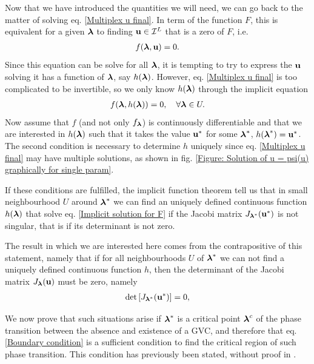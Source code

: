 \documentclass[
11pt, %
english, %
singlespacing, %
nolistspacing, %
liststotoc, %
headsepline, %
]{MastersDoctoralThesis} %
\begin{document}
Now that we have introduced the quantities we will need, we can go back to the matter of solving eq. \eqref{Multiplex u final}. In term of the function $F$, this is equivalent for a given $\boldsymbol{\mathrm{\lambda}}$ to finding $\boldsymbol{\mathrm{u}} \in \mathcal{I}^L$ that is a zero of $F$, i.e.
\begin{align}
	f(\boldsymbol{\mathrm{\lambda}}, \boldsymbol{\mathrm{u}}) = 0. \label{Implicit equation}
\end{align}
Since this equation can be solve for all $\boldsymbol{\mathrm{\lambda}}$, it is tempting to try to express the $\boldsymbol{\mathrm{u}}$ solving it has a function of $\boldsymbol{\mathrm{\lambda}}$, say $h(\boldsymbol{\mathrm{\lambda}})$. However, eq. \eqref{Multiplex u final} is too complicated to be invertible, so we only know $h(\boldsymbol{\mathrm{\lambda}})$ through the implicit equation
\begin{align}
	f(\boldsymbol{\mathrm{\lambda}}, h(\boldsymbol{\mathrm{\lambda}})) = 0, \quad \forall \boldsymbol{\mathrm{\lambda}} \in U. \label{Implicit solution for F}
\end{align}
Now assume that $f$ (and not only $f_{\boldsymbol{\mathrm{\lambda}}}$) is continuously differentiable and that we are interested in $h(\boldsymbol{\mathrm{\lambda}})$ such that it takes the value $\boldsymbol{\mathrm{u}}^*$ for some $\boldsymbol{\mathrm{\lambda}}^*$, $h(\boldsymbol{\mathrm{\lambda}}^*) = \boldsymbol{\mathrm{u}}^*$. The second condition is necessary to determine $h$ uniquely since eq. \eqref{Multiplex u final} may have multiple solutions, as shown in fig. \ref{Figure: Solution of u = psi(u) graphically for single param}.

If these conditions are fulfilled, the implicit function theorem tell us that in small neighbourhood $U$ around $\boldsymbol{\mathrm{\lambda}}^*$ we can find an uniquely defined continuous function $h(\boldsymbol{\mathrm{\lambda}})$ that solve eq. \eqref{Implicit solution for F} if the Jacobi matrix $J_{\boldsymbol{\mathrm{\lambda}}^*}(\boldsymbol{\mathrm{u}}^*)$ is not singular, that is if its determinant is not zero.

The result in which we are interested here comes from the contrapositive of this statement, namely that if for all neighbourhoods $U$ of $\boldsymbol{\mathrm{\lambda}}^*$ we can not find a uniquely defined continuous function $h$, then the determinant of the Jacobi matrix $J_{\boldsymbol{\mathrm{\lambda}}}(\boldsymbol{\mathrm{u}})$ must be zero, namely
\begin{align}
	\det\left[ J_{\boldsymbol{\mathrm{\lambda}}^*}(\boldsymbol{\mathrm{u}}^*) \right] = 0 \label{Boundary condition},
\end{align}

We now prove that such situations arise if $\boldsymbol{\mathrm{\lambda}}^*$ is a critical point $\boldsymbol{\mathrm{\lambda}}^c$ of the phase transition between the absence and existence of a GVC, and therefore that eq. \eqref{Boundary condition} is a sufficient condition to find the critical region of such phase transition. This condition has previously been stated, without proof in \cite{baxter2012avalanche}. 
\end{document}
